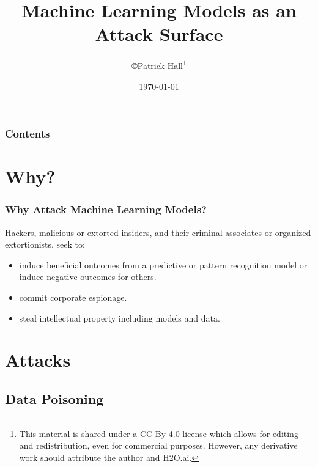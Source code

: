 \documentclass[11pt,
               aspectratio=169,
               hyperref={colorlinks}
               ]{beamer}
\author{\copyright\hspace{1pt}Patrick Hall\footnote{\tiny{This material is shared under a \href{https://creativecommons.org/licenses/by/4.0/deed.ast}{CC By 4.0 license} which allows for editing and redistribution, even for commercial purposes. However, any derivative work should attribute the author and H2O.ai.}}}
\title{Machine Learning Models as an Attack Surface}
\institute{\href{https://www.h2o.ai}{H\textsubscript{2}O.ai}}
\date{\today}
\begin{document}
	
	\maketitle
	
	\begin{frame}
	
		\frametitle{Contents}
		
		\tableofcontents{}
		
	\end{frame}

	\section{Why?}

	\begin{frame}
		
		\frametitle{Why Attack Machine Learning Models?}
Hackers, malicious or extorted insiders, and their criminal associates or organized extortionists, seek to:
			\begin{itemize}
				\item induce beneficial outcomes from a predictive or pattern recognition model or induce negative outcomes for others. %
				\item commit corporate espionage.
				\item steal intellectual property including models and data.
			\end{itemize}	
		\end{frame}

	\section{Attacks}

		\subsection{Data Poisoning}
\end{document}
